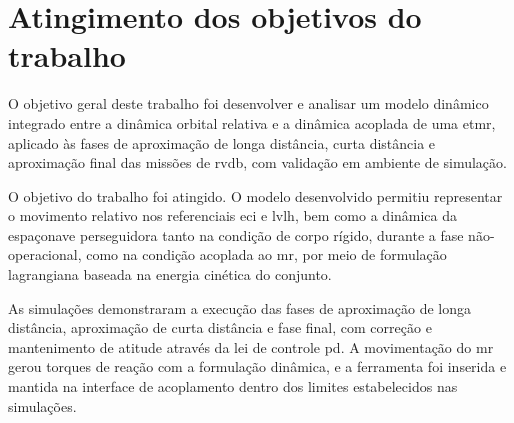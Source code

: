 \section{Atingimento dos objetivos do trabalho}

O objetivo geral deste trabalho foi desenvolver e analisar um modelo dinâmico integrado entre a dinâmica orbital relativa e a dinâmica acoplada de uma \gls{etmr}, aplicado às fases de aproximação de longa distância, curta distância e aproximação final das missões de \gls{rvdb}, com validação em ambiente de simulação.

O objetivo do trabalho foi atingido.
O modelo desenvolvido permitiu representar o movimento relativo nos referenciais \gls{eci} e \gls{lvlh}, bem como a dinâmica da espaçonave perseguidora tanto na condição de corpo rígido, durante a fase não-operacional, como na condição acoplada ao \gls{mr}, por meio de formulação lagrangiana baseada na energia cinética do conjunto.

As simulações demonstraram a execução das fases de aproximação de longa distância, aproximação de curta distância e fase final, com correção e mantenimento de atitude através da lei de controle \gls{pd}.
A movimentação do \gls{mr} gerou torques de reação com a formulação dinâmica, e a ferramenta foi inserida e mantida na interface de acoplamento dentro dos limites estabelecidos nas simulações.